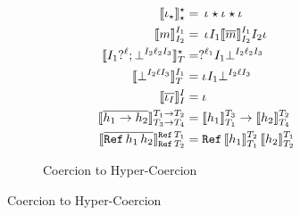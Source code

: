 \documentclass[acmtog, authorversion, acmlarge]{acmart}
\newtheorem{pos}{Postulate}
\begin{document}
\begin{figure}[tbh]
\begin{subfigure}{.5\textwidth}
\begin{align*}
      \interp{\id[\Dyn]}{\Dyn}{\Dyn}
      &= \hc{\pmt}{\Dyn}{\id}{\Dyn}{\imt}
      \\    
      \interp{\Int}{\I_1}{\I_2}
      &= \hc{\pmt}{\I_1}{\interpm{\Int}{\I_1}{\I_2}}{\I_2}{\imt}
      \\
      \interp{\Seq{\prj[\I_1]{\Lbl}}
                  {\failed{\I_2}{\Lbl_2}{\I_3}}}
             {\Dyn}{\T}
      &=
      \hcfail{\prj{\Lbl_1}}{\I_1}{\I_2}{\Lbl_2}{\I_3}
      \\
      \interp{\failed{\I_2}{\Lbl}{\I_3}}
             {\I_1}{\T}
             &=
             \hcfail{\pmt}{\I_1}{\I_2}{\Lbl}{\I_3}
      \\
      \interpm{\id[\I]}{\I}{\I} &= \id
      \\
      \interpm{\fn{\HC_1}{\HC_2}}
             {\Fn{\T_1}{\T_2}}{\Fn{\T_3}{\T_4}}
             &=
      \fn{\interp{\HC_1}{\T_3}{\T_1}}
         {\interp{\HC_2}{\T_2}{\T_4}}
      \\
      \interpm{\rf{\HC_1}{\HC_2}}
             {\Ref{\T_1}}{\Ref{\T_2}}
             &=
      \rf{\interp{\HC_1}{\T_2}{\T_1}}
         {\interp{\HC_2}{\T_1}{\T_2}}
    \end{align*}
    \caption{Coercion to Hyper-Coercion}
    \label{fig:c2h}
  \end{subfigure}
\end{figure}



  
\end{document}
